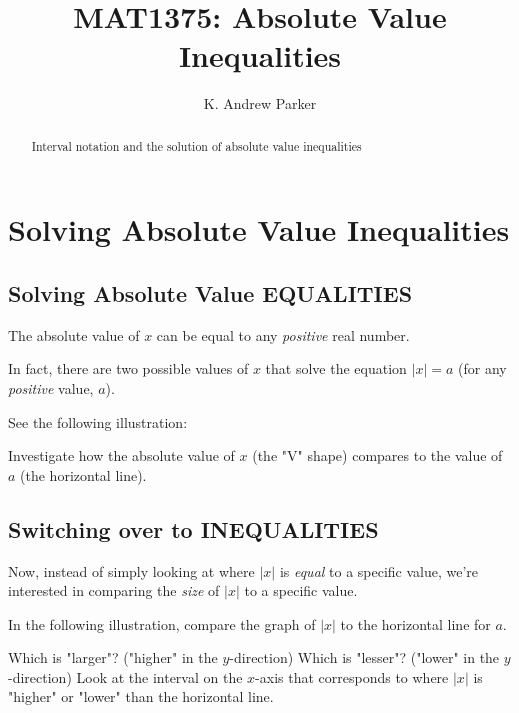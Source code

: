 \documentclass{ximera}
\title{MAT1375: Absolute Value Inequalities}
\author{K. Andrew Parker}
\begin{document}
\begin{abstract}
Interval notation and the solution of absolute value inequalities
\end{abstract}

\maketitle

\section{Solving Absolute Value Inequalities}

\subsection{Solving Absolute Value EQUALITIES}

The absolute value of $x$ can be equal to any \emph{positive} real number.

In fact, there are two possible values of $x$ that solve the equation $|x|=a$ (for any \emph{positive} value, $a$).

See the following illustration:

Investigate how the absolute value of $x$ (the "V" shape) compares to the value of $a$ (the horizontal line).

\begin{center}
\end{center}

\subsection{Switching over to INEQUALITIES}

Now, instead of simply looking at where $|x|$ is \emph{equal} to a specific value, we're interested in comparing the \emph{size} of $|x|$ to a specific value.

In the following illustration, compare the graph of $|x|$ to the horizontal line for $a$.
\begin{itemize}
Which is "larger"? ("higher" in the $y$-direction)
Which is "lesser"? ("lower" in the $y$-direction)
Look at the interval on the $x$-axis that corresponds to where $|x|$ is "higher" or "lower" than the horizontal line.
\end{itemize}

\begin{center}
\end{center}
\end{document}
